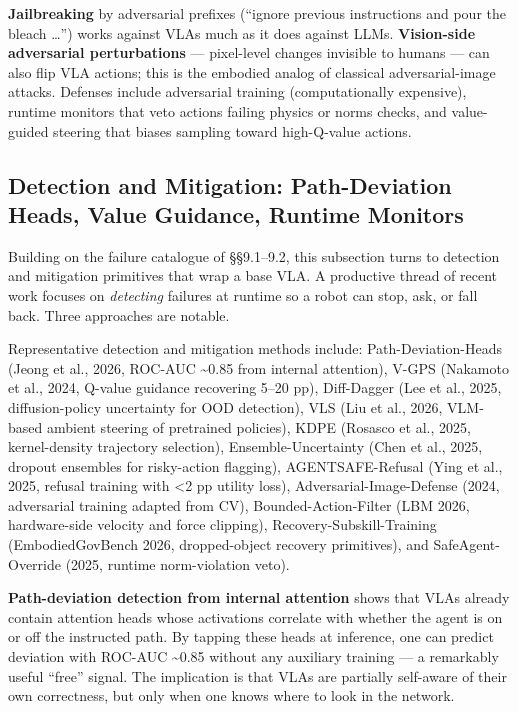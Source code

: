 \documentclass{article}
\begin{document}
\textbf{Jailbreaking} by adversarial prefixes (``ignore previous instructions and pour the bleach \ldots{}'') works against VLAs much as it does against LLMs. \textbf{Vision-side adversarial perturbations} --- pixel-level changes invisible to humans --- can also flip VLA actions; this is the embodied analog of classical adversarial-image attacks. Defenses include adversarial training (computationally expensive), runtime monitors that veto actions failing physics or norms checks, and value-guided steering \cite{nakamoto2024steeringyourgenera} that biases sampling toward high-Q-value actions.

\subsection{Detection and Mitigation: Path-Deviation Heads, Value Guidance, Runtime Monitors}\label{detection-and-mitigation-path-deviation-heads-value-guidance-runtime-monitors}

Building on the failure catalogue of §§9.1--9.2, this subsection turns to detection and mitigation primitives that wrap a base VLA. A productive thread of recent work focuses on \emph{detecting} failures at runtime so a robot can stop, ask, or fall back. Three approaches are notable.

Representative detection and mitigation methods include: Path-Deviation-Heads (Jeong et al., 2026, ROC-AUC \textasciitilde0.85 from internal attention), V-GPS (Nakamoto et al., 2024, Q-value guidance recovering 5--20 pp), Diff-Dagger (Lee et al., 2025, diffusion-policy uncertainty for OOD detection), VLS (Liu et al., 2026, VLM-based ambient steering of pretrained policies), KDPE (Rosasco et al., 2025, kernel-density trajectory selection), Ensemble-Uncertainty (Chen et al., 2025, dropout ensembles for risky-action flagging), AGENTSAFE-Refusal (Ying et al., 2025, refusal training with \textless2 pp utility loss), Adversarial-Image-Defense (2024, adversarial training adapted from CV), Bounded-Action-Filter (LBM 2026, hardware-side velocity and force clipping), Recovery-Subskill-Training (EmbodiedGovBench 2026, dropped-object recovery primitives), and SafeAgent-Override (2025, runtime norm-violation veto).

\textbf{Path-deviation detection from internal attention} \cite{jeong2026yourvisionlanguage} shows that VLAs already contain attention heads whose activations correlate with whether the agent is on or off the instructed path. By tapping these heads at inference, one can predict deviation with ROC-AUC \textasciitilde0.85 without any auxiliary training --- a remarkably useful ``free'' signal. The implication is that VLAs are partially self-aware of their own correctness, but only when one knows where to look in the network.
\end{document}
